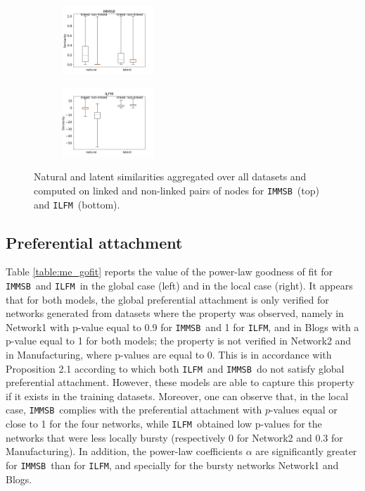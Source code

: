 \documentclass[conference]{IEEEtran}
\newcommand{\ifm}{\texttt{ILFM}}
\newcommand{\imb}{\texttt{IMMSB}}
\begin{document}
\begin{figure}[ht]
\centering
    \begin{subfigure}
       	 \centering
        	 \includegraphics[width=0.38\textwidth]{img/corpus/homo_mustach_immsb}
    \end{subfigure}
    \begin{subfigure}
        	 \centering
          \includegraphics[width=0.38\textwidth]{img/corpus/homo_mustach_ilfm}
    \end{subfigure}
    \caption{Natural and latent similarities aggregated over all datasets and computed on linked and non-linked pairs of nodes for \imb\ (top) and \ifm\ (bottom).}
    \label{fig:homo_mustach}
\end{figure}

\subsection{Preferential attachment}

Table \ref{table:me_gofit} reports the value of the power-law goodness of fit for \imb\ and \ifm\ in the global case (left) and in the local case (right). It appears that for both models, the global preferential attachment is only verified for networks generated from datasets where the property was observed, namely in Network1 with p-value equal to 0.9 for \imb\ and 1 for \ifm, and in Blogs with a p-value equal to 1 for both models; the property is not verified in Network2 and in Manufacturing, where p-values are equal to 0. This is in accordance with Proposition 2.1 according to which both \ifm\ and \imb\ do not satisfy global preferential attachment. However, these models are able to capture this property if it exists in the training datasets.  Moreover, one can observe that, in the local case, \imb\ complies with the preferential attachment with $p$-values equal or close to 1 for the four networks, while \ifm\ obtained low p-values for the networks that were less locally bursty (respectively  0  for Network2 and 0.3 for Manufacturing). In addition, the power-law coefficients $\alpha$ are significantly greater for \imb\ than for \ifm, and specially for the bursty networks Network1 and Blogs.
\end{document}
